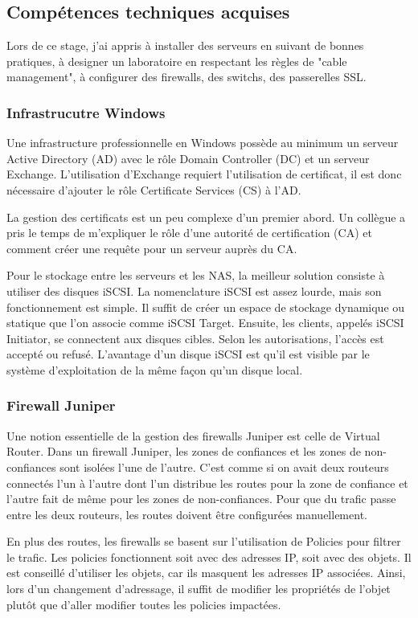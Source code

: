 \subsection{Compétences techniques acquises}
Lors de ce stage, j'ai appris à installer des serveurs en suivant de bonnes pratiques, à designer un laboratoire en respectant les règles de "cable management", à configurer des firewalls, des switchs, des passerelles SSL. 
\subsubsection{Infrastrucutre Windows}
Une infrastructure professionnelle en Windows possède au minimum un serveur Active Directory (AD) avec le rôle Domain Controller (DC) et un serveur Exchange. 
L'utilisation d'Exchange requiert l'utilisation de certificat, il est donc nécessaire d'ajouter le rôle Certificate Services (CS) à l'AD.

La gestion des certificats est un peu complexe d'un premier abord.
Un collègue a pris le temps de m'expliquer le rôle d'une autorité de certification (CA) et comment créer une requête pour un serveur auprès du CA. 

Pour le stockage entre les serveurs et les NAS, la meilleur solution consiste à utiliser des disques iSCSI.
La nomenclature iSCSI est assez lourde, mais son fonctionnement est simple. 
Il suffit de créer un espace de stockage dynamique ou statique que l'on associe comme iSCSI Target. 
Ensuite, les clients, appelés iSCSI Initiator, se connectent aux disques cibles. 
Selon les autorisations, l'accès est accepté ou refusé.
L'avantage d'un disque iSCSI est qu'il est visible par le système d'exploitation de la même façon qu'un disque local. 

\subsubsection{Firewall Juniper}
Une notion essentielle de la gestion des firewalls Juniper est celle de Virtual Router.
Dans un firewall Juniper, les zones de confiances et les zones de non-confiances sont isolées l'une de l'autre.
C'est comme si on avait deux routeurs connectés l'un à l'autre dont l'un distribue les routes pour la zone de confiance et l'autre fait de même pour les zones de non-confiances.
Pour que du trafic passe entre les deux routeurs, les routes doivent être configurées manuellement.

En plus des routes, les firewalls se basent sur l'utilisation de Policies pour filtrer le trafic.
Les policies fonctionnent soit avec des adresses IP, soit avec des objets. 
Il est conseillé d'utiliser les objets, car ils masquent les adresses IP associées. 
Ainsi, lors d'un changement d'adressage, il suffit de modifier les propriétés de l'objet plutôt que d'aller modifier toutes les policies impactées.

